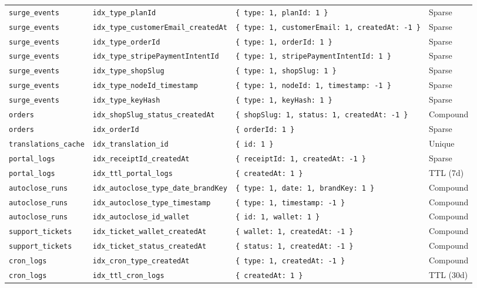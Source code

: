 \documentclass[11pt,a4paper]{article}
\begin{document}
\begin{center}
\begin{longtable}{p{3.2cm}p{6.8cm}p{5.2cm}p{1.8cm}}
\texttt{surge\_events} & \texttt{idx\_type\_planId} & \texttt{\{ type: 1, planId: 1 \}} & Sparse \\
\texttt{surge\_events} & \texttt{idx\_type\_customerEmail\_createdAt} & \texttt{\{ type: 1, customerEmail: 1, createdAt: -1 \}} & Sparse \\
\texttt{surge\_events} & \texttt{idx\_type\_orderId} & \texttt{\{ type: 1, orderId: 1 \}} & Sparse \\
\texttt{surge\_events} & \texttt{idx\_type\_stripePaymentIntentId} & \texttt{\{ type: 1, stripePaymentIntentId: 1 \}} & Sparse \\
\texttt{surge\_events} & \texttt{idx\_type\_shopSlug} & \texttt{\{ type: 1, shopSlug: 1 \}} & Sparse \\
\texttt{surge\_events} & \texttt{idx\_type\_nodeId\_timestamp} & \texttt{\{ type: 1, nodeId: 1, timestamp: -1 \}} & Sparse \\
\texttt{surge\_events} & \texttt{idx\_type\_keyHash} & \texttt{\{ type: 1, keyHash: 1 \}} & Sparse \\
\midrule
\texttt{orders} & \texttt{idx\_shopSlug\_status\_createdAt} & \texttt{\{ shopSlug: 1, status: 1, createdAt: -1 \}} & Compound \\
\texttt{orders} & \texttt{idx\_orderId} & \texttt{\{ orderId: 1 \}} & Sparse \\
\midrule
\texttt{translations\_cache} & \texttt{idx\_translation\_id} & \texttt{\{ id: 1 \}} & Unique \\
\midrule
\texttt{portal\_logs} & \texttt{idx\_receiptId\_createdAt} & \texttt{\{ receiptId: 1, createdAt: -1 \}} & Sparse \\
\texttt{portal\_logs} & \texttt{idx\_ttl\_portal\_logs} & \texttt{\{ createdAt: 1 \}} & TTL (7d) \\
\midrule
\texttt{autoclose\_runs} & \texttt{idx\_autoclose\_type\_date\_brandKey} & \texttt{\{ type: 1, date: 1, brandKey: 1 \}} & Compound \\
\texttt{autoclose\_runs} & \texttt{idx\_autoclose\_type\_timestamp} & \texttt{\{ type: 1, timestamp: -1 \}} & Compound \\
\texttt{autoclose\_runs} & \texttt{idx\_autoclose\_id\_wallet} & \texttt{\{ id: 1, wallet: 1 \}} & Compound \\
\midrule
\texttt{support\_tickets} & \texttt{idx\_ticket\_wallet\_createdAt} & \texttt{\{ wallet: 1, createdAt: -1 \}} & Compound \\
\texttt{support\_tickets} & \texttt{idx\_ticket\_status\_createdAt} & \texttt{\{ status: 1, createdAt: -1 \}} & Compound \\
\midrule
\texttt{cron\_logs} & \texttt{idx\_cron\_type\_createdAt} & \texttt{\{ type: 1, createdAt: -1 \}} & Compound \\
\texttt{cron\_logs} & \texttt{idx\_ttl\_cron\_logs} & \texttt{\{ createdAt: 1 \}} & TTL (30d) \\
\end{longtable}
\end{center}
\end{document}
